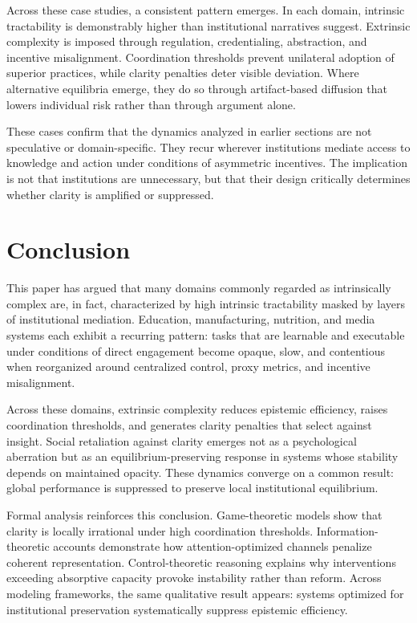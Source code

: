 \documentclass[11pt]{article}
\begin{document}
Across these case studies, a consistent pattern emerges. In each domain, intrinsic tractability is demonstrably higher than institutional narratives suggest. Extrinsic complexity is imposed through regulation, credentialing, abstraction, and incentive misalignment. Coordination thresholds prevent unilateral adoption of superior practices, while clarity penalties deter visible deviation. Where alternative equilibria emerge, they do so through artifact-based diffusion that lowers individual risk rather than through argument alone.

These cases confirm that the dynamics analyzed in earlier sections are not speculative or domain-specific. They recur wherever institutions mediate access to knowledge and action under conditions of asymmetric incentives. The implication is not that institutions are unnecessary, but that their design critically determines whether clarity is amplified or suppressed.



\section{Conclusion}

This paper has argued that many domains commonly regarded as intrinsically complex are, in fact, characterized by high intrinsic tractability masked by layers of institutional mediation. Education, manufacturing, nutrition, and media systems each exhibit a recurring pattern: tasks that are learnable and executable under conditions of direct engagement become opaque, slow, and contentious when reorganized around centralized control, proxy metrics, and incentive misalignment.

Across these domains, extrinsic complexity reduces epistemic efficiency, raises coordination thresholds, and generates clarity penalties that select against insight. Social retaliation against clarity emerges not as a psychological aberration but as an equilibrium-preserving response in systems whose stability depends on maintained opacity. These dynamics converge on a common result: global performance is suppressed to preserve local institutional equilibrium.

Formal analysis reinforces this conclusion. Game-theoretic models show that clarity is locally irrational under high coordination thresholds. Information-theoretic accounts demonstrate how attention-optimized channels penalize coherent representation. Control-theoretic reasoning explains why interventions exceeding absorptive capacity provoke instability rather than reform. Across modeling frameworks, the same qualitative result appears: systems optimized for institutional preservation systematically suppress epistemic efficiency.
\end{document}
